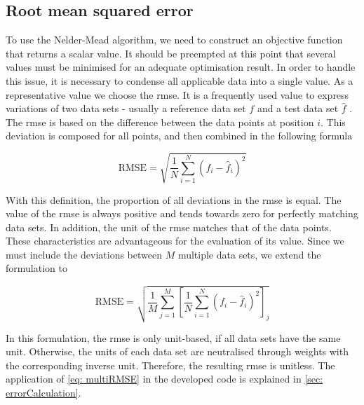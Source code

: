 \subsection{Root mean squared error} \label{subsec: RMSE}
To use the Nelder-Mead algorithm, we need to construct an objective function that returns a scalar value. It should be preempted at this point that several values must be minimised for an adequate optimisation result. In order to handle this issue, it is necessary to condense all applicable data into a single value. As a representative value we choose the \acrfull{rmse}. It is a frequently used value to express variations of two data sets - usually a reference data set $f$ and a test data set $\hat{f}$ \cite{morrow_method_2010}. The \acrshort{rmse} is based on the difference between the data points at position $i$. This deviation is composed for all points, and then combined in the following formula

\begin{equation} \label{eq: RMSE}
    \text{RMSE} = \sqrt{\frac{1}{N}\sum_{i=1}^{N} (f_i - \hat{f}_i)^2}
\end{equation}

With this definition, the proportion of all deviations in the \acrshort{rmse} is equal. The value of the \acrshort{rmse} is always positive and tends towards zero for perfectly matching data sets. In addition, the unit of the \acrshort{rmse} matches that of the data points. These characteristics are advantageous for the evaluation of its value. Since we must include the deviations between $M$ multiple data sets, we extend the formulation to 

\begin{equation} \label{eq: multiRMSE}
    \text{RMSE} = \sqrt{\frac{1}{M} \sum_{j=1}^{M} \left[ \frac{1}{N} \sum_{i=1}^{N} (f_i - \hat{f}_i)^2 \right] _j}
\end{equation}

In this formulation, the \acrshort{rmse} is only unit-based, if all data sets have the same unit. Otherwise, the units of each data set are neutralised through weights with the corresponding inverse unit. Therefore, the resulting \acrshort{rmse} is unitless. The application of \autoref{eq: multiRMSE} in the developed code is explained in \autoref{sec: errorCalculation}. 



